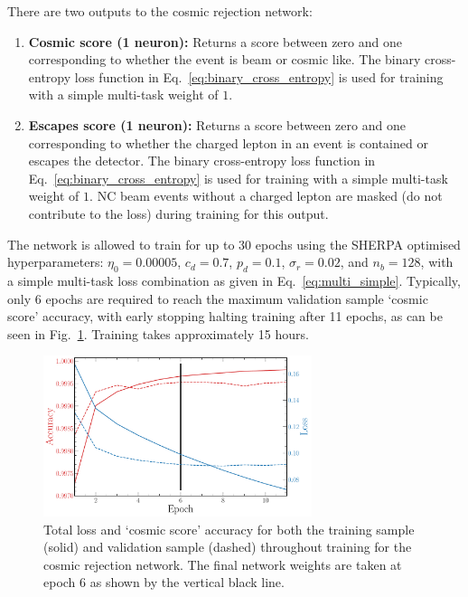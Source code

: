 There are two outputs to the cosmic rejection network:
\begin{enumerate}
    \item \textbf{Cosmic score (1 neuron):} Returns a score between zero and one corresponding to
          whether the event is beam or cosmic like. The binary cross-entropy loss function in
          Eq.~\ref{eq:binary_cross_entropy} is used for training with a simple multi-task weight
          of $1$.
    \item \textbf{Escapes score (1 neuron):} Returns a score between zero and one corresponding to
          whether the charged lepton in an event is contained or escapes the detector. The binary
          cross-entropy loss function in Eq.~\ref{eq:binary_cross_entropy} is used for training
          with a simple multi-task weight of $1$. NC beam events without a charged lepton are
          masked (do not contribute to the loss) during training for this output.
\end{enumerate}

The network is allowed to train for up to 30 epochs using the SHERPA optimised hyperparameters:
$\eta_{0}=0.00005$, $c_{d}=0.7$, $p_{d}=0.1$, $\sigma_{r}=0.02$, and $n_{b}=128$, with a simple
multi-task loss combination as given in Eq.~\ref{eq:multi_simple}. Typically, only 6 epochs are
required to reach the maximum validation sample `cosmic score' accuracy, with early stopping
halting training after 11 epochs, as can be seen in Fig.~\ref{fig:final_cosmic_history}. Training
takes approximately 15 hours.

\begin{figure} %
    \includegraphics[width=0.7\textwidth]{diagrams/6-cvn/chipsnet/final_cosmic_history.pdf}
    \caption[Loss and accuracy throughout training for the cosmic rejection network.]
    {Total loss and `cosmic score' accuracy for both the training sample (solid) and validation
        sample (dashed) throughout training for the cosmic rejection network. The final network
        weights are taken at epoch 6 as shown by the vertical black line.}
    \label{fig:final_cosmic_history}
\end{figure}

